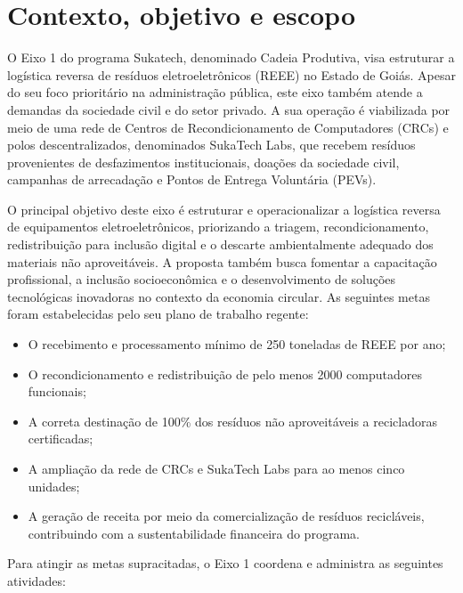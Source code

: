 \documentclass[
	12pt,				%
	openright,			%
	twoside,			%
	a4paper,			%
	english,			%
	french,				%
	spanish,			%
	brazil,				%
	]{abntex2}
\begin{document}
\section{Contexto, objetivo e escopo}

O Eixo 1 do programa Sukatech, denominado Cadeia Produtiva, visa estruturar a logística reversa de resíduos eletroeletrônicos (REEE) no Estado de Goiás. Apesar do seu foco prioritário na administração pública, este eixo também atende a demandas da sociedade civil e do setor privado. A sua operação é viabilizada por meio de uma rede de Centros de Recondicionamento de Computadores (CRCs) e polos descentralizados, denominados SukaTech Labs, que recebem resíduos provenientes de desfazimentos institucionais, doações da sociedade civil, campanhas de arrecadação e Pontos de Entrega Voluntária (PEVs).

O principal objetivo deste eixo é estruturar e operacionalizar a logística reversa de equipamentos eletroeletrônicos, priorizando a triagem, recondicionamento, redistribuição para inclusão digital e o descarte ambientalmente adequado dos materiais não aproveitáveis. A proposta também busca fomentar a capacitação profissional, a inclusão socioeconômica e o desenvolvimento de soluções tecnológicas inovadoras no contexto da economia circular. As seguintes metas foram estabelecidas pelo seu plano de trabalho regente:

\begin{itemize}
  \item O recebimento e processamento mínimo de 250 toneladas de REEE por ano;
  \item O recondicionamento e redistribuição de pelo menos 2000 computadores funcionais;
  \item A correta destinação de 100\% dos resíduos não aproveitáveis a recicladoras certificadas;
  \item A ampliação da rede de CRCs e SukaTech Labs para ao menos cinco unidades;
  \item A geração de receita por meio da comercialização de resíduos recicláveis, contribuindo com a sustentabilidade financeira do programa.
\end{itemize}

Para atingir as metas supracitadas, o Eixo 1 coordena e administra as seguintes atividades:
\end{document}
